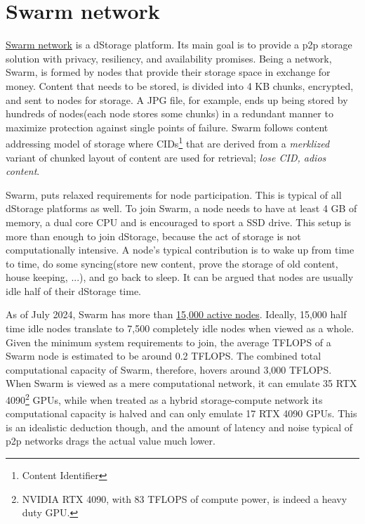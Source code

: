 \documentclass[a4paper, 10pt]{article}
\begin{document}
\section{Swarm network}
\href{https://www.ethswarm.org/}{Swarm network} is a dStorage platform. Its main goal is to provide a p2p storage solution with privacy, resiliency, and availability promises. Being a network, Swarm, is formed by nodes that provide their storage space in exchange for money. Content that needs to be stored, is divided into 4 KB chunks, encrypted, and sent to nodes for storage. A JPG file, for example, ends up being stored by hundreds of nodes(each node stores some chunks) in a redundant manner to maximize protection against single points of failure. Swarm follows content addressing model of storage where CIDs\footnote{Content Identifier} that are derived from a \textit{merklized} variant of chunked layout of content are used for retrieval; \textit{lose CID, adios content}.
\par
Swarm, puts relaxed requirements for node participation. This is typical of all dStorage platforms as well. To join Swarm, a node needs to have at least 4 GB of memory, a dual core CPU and is encouraged to sport a SSD drive. This setup is more than enough to join dStorage, because the act of storage is not computationally intensive. A node's typical contribution is to wake up from time to time, do some syncing(store new content, prove the storage of old content, house keeping, ...), and go back to sleep. It can be argued that nodes are usually idle half of their dStorage time. 
\par
As of July 2024, Swarm has more than \href{https://swarmscan.io/stats/availability}{15,000 active nodes}. Ideally, 15,000 half time idle nodes translate to 7,500 completely idle nodes when viewed as a whole. Given the minimum system requirements to join, the average TFLOPS of a Swarm node is estimated to be around 0.2 TFLOPS. The combined total computational capacity of Swarm, therefore, hovers around 3,000 TFLOPS. When Swarm is viewed as a mere computational network, it can emulate 35 RTX 4090\footnote{NVIDIA RTX 4090, with 83 TFLOPS of compute power, is indeed a heavy duty GPU.} GPUs, while when treated as a hybrid storage-compute network its computational capacity is halved and can only emulate 17 RTX 4090 GPUs. This is an idealistic deduction though, and the amount of latency and noise typical of p2p networks drags the actual value much lower. 
\end{document}
